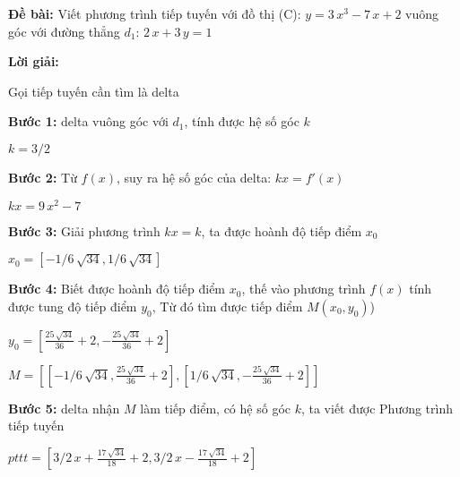 \documentclass[preview,14pt]{standalone}
\begin{document}
\textbf{Đề bài:} Viết phương trình tiếp tuyến với đồ thị (C): $y = 3\,{x}^{3}-7\,x+2
$  vuông góc với đường thẳng $d_1$: $2\,x+3\,y=1
$

\textbf{Lời giải:}

Gọi tiếp tuyến cần tìm là delta

\textbf{Bước 1:} delta vuông góc với $d_1$, tính được hệ số góc $k$

$k = $$3/2
$

\textbf{Bước 2:} Từ $f(x)$, suy ra hệ số góc của delta: $kx = f'(x)$

$kx = $$9\,{x}^{2}-7
$

\textbf{Bước 3:} Giải phương trình $kx = k$, ta được hoành độ tiếp điểm $x_0$

$x_0 = $$[-1/6\,\sqrt {34},1/6\,\sqrt {34}]
$

\textbf{Bước 4:} Biết được hoành độ tiếp điểm $x_0$, thế vào phương trình $f(x)$ tính được tung độ tiếp điểm $y_0$, Từ đó tìm được tiếp điểm $M(x_0, y_0)$)

$y_0 = $$[{\frac {25\,\sqrt {34}}{36}}+2,-{\frac {25\,\sqrt {34}}{36}}+2]
$

$M = $$[[-1/6\,\sqrt {34},{\frac {25\,\sqrt {34}}{36}}+2],[1/6\,\sqrt {34},-{
\frac {25\,\sqrt {34}}{36}}+2]]
$

\textbf{Bước 5:} delta nhận $M$ làm tiếp điểm, có hệ số góc $k$, ta viết được Phương trình tiếp tuyến

$pttt = $$[3/2\,x+{\frac {17\,\sqrt {34}}{18}}+2,3/2\,x-{\frac {17\,\sqrt {34}}{
18}}+2]
$
\end{document}
